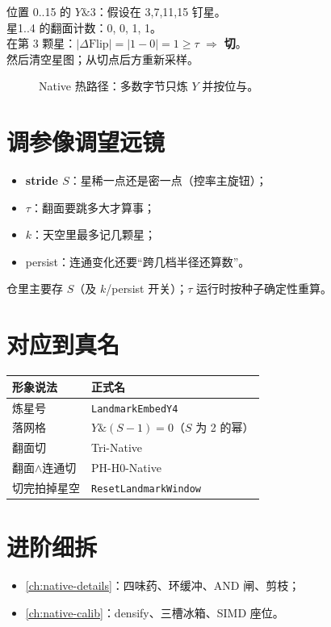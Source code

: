 \begin{toybox}[stride=4 的迷你宇宙]
位置 0..15 的 $Y\&3$：假设在 3,7,11,15 钉星。\\
星1..4 的翻面计数：0, 0, 1, 1。\\
在第 3 颗星：$|\Delta\mathrm{Flip}|=|1-0|=1\ge\tau$ $\Rightarrow$ \textbf{切}。\\
然后清空星图；从切点后方重新采样。
\end{toybox}

\begin{figure}[htbp]
\centering
{}
\caption{Native 热路径：多数字节只炼 $Y$ 并按位与。}
\label{fig:native-pipe}
\end{figure}

\section{调参像调望远镜}

\begin{itemize}[nosep]
  \item \textbf{stride $S$}：星稀一点还是密一点（控率主旋钮）；
  \item $\tau$：翻面要跳多大才算事；
  \item $k$：天空里最多记几颗星；
  \item persist：连通变化还要``跨几档半径还算数''。
\end{itemize}
仓里主要存 $S$（及 $k$/persist 开关）；$\tau$ 运行时按种子确定性重算。

\section{对应到真名}

\begin{center}
\begin{tabular}{@{}ll@{}}
\toprule
形象说法 & 正式名 \\
\midrule
炼星号 & \texttt{LandmarkEmbedY4} \\
落网格 & $Y\&(S-1)=0$（$S$ 为 2 的幂） \\
翻面切 & Tri-Native \\
翻面$\land$连通切 & PH-H0-Native \\
切完拍掉星空 & \texttt{ResetLandmarkWindow} \\
\bottomrule
\end{tabular}
\end{center}

\section{进阶细拆}

\begin{itemize}[nosep]
  \item \cref{ch:native-details}：四味药、环缓冲、AND 闸、剪枝；
  \item \cref{ch:native-calib}：densify、三槽冰箱、SIMD 座位。
\end{itemize}
